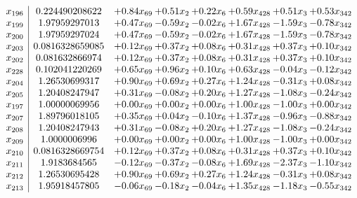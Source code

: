 \documentclass[8pt]{article}
\begin{document}
\[\begin{array}{c| c c@{\hskip 2pt} c@{\hskip 2pt} c@{\hskip 2pt} c@{\hskip 2pt} c@{\hskip 2pt} c@{\hskip 2pt} }
 x_{196}   &  0.224490208622 & +  0.84 x_{69} & +  0.51 x_{2} & +  0.22 x_{6} & +  0.59 x_{428} & +  0.51 x_{3} & +  0.53 x_{342}\\
 x_{199}   &  1.97959297013 & +  0.47 x_{69} & -0.59 x_{2} & -0.02 x_{6} & +  1.67 x_{428} & -1.59 x_{3} & -0.78 x_{342}\\
 x_{200}   &  1.97959297024 & +  0.47 x_{69} & -0.59 x_{2} & -0.02 x_{6} & +  1.67 x_{428} & -1.59 x_{3} & -0.78 x_{342}\\
 x_{203}   &  0.0816328659085 & +  0.12 x_{69} & +  0.37 x_{2} & +  0.08 x_{6} & +  0.31 x_{428} & +  0.37 x_{3} & +  0.10 x_{342}\\
 x_{202}   &  0.081632866974 & +  0.12 x_{69} & +  0.37 x_{2} & +  0.08 x_{6} & +  0.31 x_{428} & +  0.37 x_{3} & +  0.10 x_{342}\\
 x_{228}   &  0.102041220269 & +  0.65 x_{69} & +  0.96 x_{2} & +  0.10 x_{6} & +  0.63 x_{428} & -0.04 x_{3} & -0.12 x_{342}\\
 x_{204}   &  1.26530699317 & +  0.90 x_{69} & +  0.69 x_{2} & +  0.27 x_{6} & +  1.24 x_{428} & -0.31 x_{3} & +  0.08 x_{342}\\
 x_{205}   &  1.20408247947 & +  0.31 x_{69} & -0.08 x_{2} & +  0.20 x_{6} & +  1.27 x_{428} & -1.08 x_{3} & -0.24 x_{342}\\
 x_{197}   &  1.00000069956 & +  0.00 x_{69} & +  0.00 x_{2} & +  0.00 x_{6} & +  1.00 x_{428} & -1.00 x_{3} & +  0.00 x_{342}\\
 x_{207}   &  1.89796018105 & +  0.35 x_{69} & +  0.04 x_{2} & -0.10 x_{6} & +  1.37 x_{428} & -0.96 x_{3} & -0.88 x_{342}\\
 x_{208}   &  1.20408247943 & +  0.31 x_{69} & -0.08 x_{2} & +  0.20 x_{6} & +  1.27 x_{428} & -1.08 x_{3} & -0.24 x_{342}\\
 x_{209}   &  1.0000006996 & +  0.00 x_{69} & +  0.00 x_{2} & +  0.00 x_{6} & +  1.00 x_{428} & -1.00 x_{3} & +  0.00 x_{342}\\
 x_{210}   &  0.0816328669754 & +  0.12 x_{69} & +  0.37 x_{2} & +  0.08 x_{6} & +  0.31 x_{428} & +  0.37 x_{3} & +  0.10 x_{342}\\
 x_{211}   &  1.9183684565 & -0.12 x_{69} & -0.37 x_{2} & -0.08 x_{6} & +  1.69 x_{428} & -2.37 x_{3} & -1.10 x_{342}\\
 x_{212}   &  1.26530695428 & +  0.90 x_{69} & +  0.69 x_{2} & +  0.27 x_{6} & +  1.24 x_{428} & -0.31 x_{3} & +  0.08 x_{342}\\
 x_{213}   &  1.95918457805 & -0.06 x_{69} & -0.18 x_{2} & -0.04 x_{6} & +  1.35 x_{428} & -1.18 x_{3} & -0.55 x_{342}\\

\end{array}\]
\end{document}
